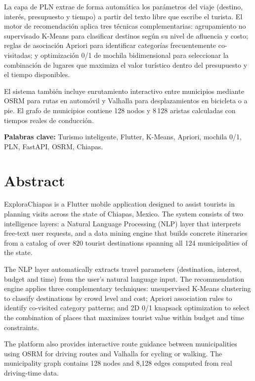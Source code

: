\documentclass[12pt,letterpaper]{report}
\begin{document}
La capa de PLN extrae de forma automática los parámetros del viaje (destino, interés, presupuesto
y tiempo) a partir del texto libre que escribe el turista. El motor de recomendación aplica tres
técnicas complementarias: agrupamiento no supervisado K-Means para clasificar destinos según su
nivel de afluencia y costo; reglas de asociación Apriori para identificar categorías
frecuentemente co-visitadas; y optimización 0/1 de mochila bidimensional para seleccionar la
combinación de lugares que maximiza el valor turístico dentro del presupuesto y el tiempo
disponibles.

El sistema también incluye enrutamiento interactivo entre municipios mediante OSRM para rutas en
automóvil y Valhalla para desplazamientos en bicicleta o a pie. El grafo de municipios contiene
128 nodos y 8\,128 aristas calculadas con tiempos reales de conducción.

\bigskip
\noindent\textbf{Palabras clave:} Turismo inteligente, Flutter, K-Means, Apriori, mochila 0/1, PLN,
FastAPI, OSRM, Chiapas.

\chapter*{Abstract}

ExploraChiapas is a Flutter mobile application designed to assist tourists in planning visits
across the state of Chiapas, Mexico. The system consists of two intelligence layers: a Natural
Language Processing (NLP) layer that interprets free-text user requests, and a data mining engine
that builds concrete itineraries from a catalog of over 820 tourist destinations spanning all 124
municipalities of the state.

The NLP layer automatically extracts travel parameters (destination, interest, budget and time)
from the user's natural language input. The recommendation engine applies three complementary
techniques: unsupervised K-Means clustering to classify destinations by crowd level and cost;
Apriori association rules to identify co-visited category patterns; and 2D 0/1 knapsack
optimization to select the combination of places that maximizes tourist value within budget and
time constraints.

The platform also provides interactive route guidance between municipalities using OSRM for
driving routes and Valhalla for cycling or walking. The municipality graph contains 128 nodes
and 8,128 edges computed from real driving-time data.
\end{document}
